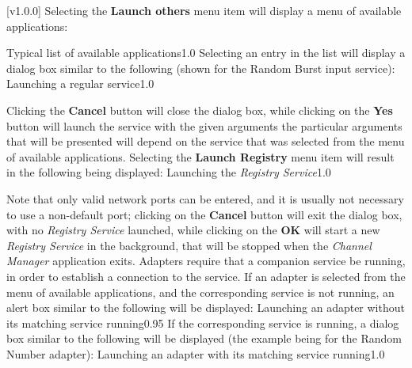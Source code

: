 [v1.0.0]
Selecting the \textbf{Launch others \textellipsis} menu item will display a menu of
available applications:

%
{Typical list of available applications}{1.0}
\condPage{}
Selecting an entry in the list will display a dialog box similar to the following (shown
for the Random Burst input service):
%
{Launching a regular service}{1.0}

Clicking the \textbf{Cancel} button will close the dialog box, while clicking on the
\textbf{Yes} button will launch the service with the given arguments \longDash{} the
particular arguments that will be presented will depend on the service that was selected
from the menu of available applications.
\secondaryEnd
\condPage
{}
Selecting the \textbf{Launch Registry} menu item will result in the following being
displayed:
%
{Launching the \emph{Registry Service}}{1.0}

Note that only valid network ports can be entered, and it is usually not necessary to use
a non-default port; clicking on the \textbf{Cancel} button will exit the dialog box, with
no \emph{Registry Service} launched, while clicking on the \textbf{OK} will start a new
\emph{Registry Service} in the background, that will be stopped when the
\emph{Channel Manager} application exits.
\secondaryEnd
{}
Adapters require that a companion service be running, in order to establish a connection
to the service.
If an adapter is selected from the menu of available applications, and the corresponding
service is not running, an alert box similar to the following will be displayed:
%
{Launching an adapter without its matching service running}{0.95}
\condPage{}
If the corresponding service is running, a dialog box similar to the following will be
displayed (the example being for the Random Number adapter):
%
{Launching an adapter with its matching service running}{1.0}

